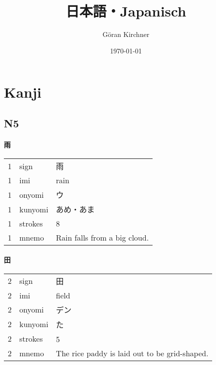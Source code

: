 \documentclass[justified, a4paper, notitlepage, captions=tableheading, nobib]{tufte-handout}
\author{Göran Kirchner}
\date{\today}
\title{日本語・Japanisch}
\newcommand{\textls}[2][5]{%
\begingroup\addfontfeatures{LetterSpace=#1}#2\endgroup
}
\renewcommand{\allcapsspacing}[1]{\textls[15]{#1}}
\renewcommand{\smallcapsspacing}[1]{\textls[10]{#1}}
\renewcommand{\allcaps}[1]{\textls[15]{\MakeTextUppercase{#1}}}
\renewcommand{\smallcaps}[1]{\smallcapsspacing{\scshape\MakeTextLowercase{#1}}}
\renewcommand{\textsc}[1]{\smallcapsspacing{\textsmallcaps{#1}}}
\begin{document}
\maketitle
\tableofcontents

\ifxetex
  \newcommand{\textls}[2][5]{%
    \begingroup\addfontfeatures{LetterSpace=#1}#2\endgroup
  }
  \renewcommand{\allcapsspacing}[1]{\textls[15]{#1}}
  \renewcommand{\smallcapsspacing}[1]{\textls[10]{#1}}
  \renewcommand{\allcaps}[1]{\textls[15]{\MakeTextUppercase{#1}}}
  \renewcommand{\smallcaps}[1]{\smallcapsspacing{\scshape\MakeTextLowercase{#1}}}
  \renewcommand{\textsc}[1]{\smallcapsspacing{\textsmallcaps{#1}}}
\fi

\newpage
\section{Kanji }
\label{sec:org833dc47}

\subsection{N5 }
\label{sec:org576135d}

\paragraph{雨}
\label{sec:org4364250}

\label{tab:org12a0672}
\begin{tabular}{rll}
1 & sign & 雨\\
1 & imi & rain\\
1 & onyomi & ウ\\
1 & kunyomi & あめ・あま\\
1 & strokes & 8\\
1 & mnemo & Rain falls from a big cloud.\\
\end{tabular}

\paragraph{田}
\label{sec:org1426dcb}

\label{tab:orgfca04e6}
\begin{tabular}{rll}
2 & sign & 田\\
2 & imi & field\\
2 & onyomi & デン\\
2 & kunyomi & た\\
2 & strokes & 5　\\
2 & mnemo & The rice paddy is laid out to be grid-shaped.\\
\end{tabular}
\end{document}
